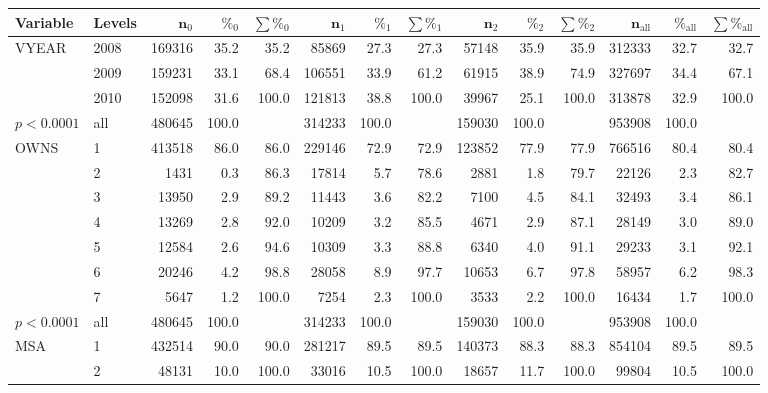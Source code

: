 \begin{table}[ht]
\centering
{\footnotesize
\begin{tabular}{ll|rrr|rrr|rrr|rrr}
 \textbf{Variable} & \textbf{Levels} & $\mathbf{n_{\mathrm{0}}}$ & $\mathbf{\%_{\mathrm{0}}}$ & $\mathbf{\sum \%_{\mathrm{0}}}$ & $\mathbf{n_{\mathrm{1}}}$ & $\mathbf{\%_{\mathrm{1}}}$ & $\mathbf{\sum \%_{\mathrm{1}}}$ & $\mathbf{n_{\mathrm{2}}}$ & $\mathbf{\%_{\mathrm{2}}}$ & $\mathbf{\sum \%_{\mathrm{2}}}$ & $\mathbf{n_{\mathrm{all}}}$ & $\mathbf{\%_{\mathrm{all}}}$ & $\mathbf{\sum \%_{\mathrm{all}}}$ \\ 
  \hline
VYEAR & 2008 & 169316 & 35.2 & 35.2 & 85869 & 27.3 & 27.3 & 57148 & 35.9 & 35.9 & 312333 & 32.7 & 32.7 \\ 
   & 2009 & 159231 & 33.1 & 68.4 & 106551 & 33.9 & 61.2 & 61915 & 38.9 & 74.9 & 327697 & 34.4 & 67.1 \\ 
   & 2010 & 152098 & 31.6 & 100.0 & 121813 & 38.8 & 100.0 & 39967 & 25.1 & 100.0 & 313878 & 32.9 & 100.0 \\ 
   \hline
$p< 0.0001$ & all & 480645 & 100.0 &  & 314233 & 100.0 &  & 159030 & 100.0 &  & 953908 & 100.0 &  \\ 
   \hline
\hline
OWNS & 1 & 413518 & 86.0 & 86.0 & 229146 & 72.9 & 72.9 & 123852 & 77.9 & 77.9 & 766516 & 80.4 & 80.4 \\ 
   & 2 & 1431 & 0.3 & 86.3 & 17814 & 5.7 & 78.6 & 2881 & 1.8 & 79.7 & 22126 & 2.3 & 82.7 \\ 
   & 3 & 13950 & 2.9 & 89.2 & 11443 & 3.6 & 82.2 & 7100 & 4.5 & 84.1 & 32493 & 3.4 & 86.1 \\ 
   & 4 & 13269 & 2.8 & 92.0 & 10209 & 3.2 & 85.5 & 4671 & 2.9 & 87.1 & 28149 & 3.0 & 89.0 \\ 
   & 5 & 12584 & 2.6 & 94.6 & 10309 & 3.3 & 88.8 & 6340 & 4.0 & 91.1 & 29233 & 3.1 & 92.1 \\ 
   & 6 & 20246 & 4.2 & 98.8 & 28058 & 8.9 & 97.7 & 10653 & 6.7 & 97.8 & 58957 & 6.2 & 98.3 \\ 
   & 7 & 5647 & 1.2 & 100.0 & 7254 & 2.3 & 100.0 & 3533 & 2.2 & 100.0 & 16434 & 1.7 & 100.0 \\ 
   \hline
$p< 0.0001$ & all & 480645 & 100.0 &  & 314233 & 100.0 &  & 159030 & 100.0 &  & 953908 & 100.0 &  \\ 
   \hline
\hline
MSA & 1 & 432514 & 90.0 & 90.0 & 281217 & 89.5 & 89.5 & 140373 & 88.3 & 88.3 & 854104 & 89.5 & 89.5 \\ 
   & 2 & 48131 & 10.0 & 100.0 & 33016 & 10.5 & 100.0 & 18657 & 11.7 & 100.0 & 99804 & 10.5 & 100.0 \\ 

\end{tabular}}
\end{table}
